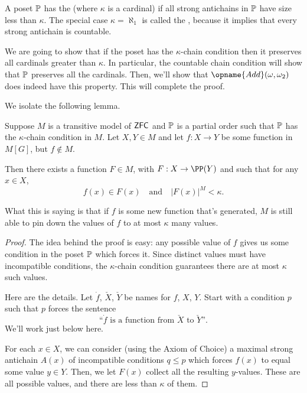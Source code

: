 \begin{definition}
	A poset $\mathbb P$ has the 
	(where $\kappa$ is a cardinal) if all strong antichains
	in $\mathbb P$ have size less than $\kappa$.
	The special case $\kappa = \aleph_1$ is called the ,
	because it implies that every strong antichain is countable.
\end{definition}

We are going to show that if the poset has the $\kappa$-chain condition
then it preserves all cardinals greater than $\kappa$.
In particular, the countable chain condition will show that $\mathbb P$ preserves all the cardinals.
Then, we'll show that $\opname{Add}(\omega, \omega_2)$ does indeed have this property.
This will complete the proof.

We isolate the following lemma.
\begin{lemma}
	Suppose $M$ is a transitive model of $\mathsf{ZFC}$ and $\mathbb P$ is a partial order
	such that $\mathbb P$ has the $\kappa$-chain condition in $M$.
	Let $X,Y \in M$ and let $f: X \to Y$
	be some function in $M[G]$, but $f \notin M$.

	Then there exists a function $F \in M$, with $F: X \to \PP(Y)$ and such that
	for any $x \in X$,
	\[ f(x) \in F(x) \quad\text{and}\quad \left\lvert F(x) \right\rvert^M < \kappa. \]
\end{lemma}
What this is saying is that if $f$ is some new function that's generated,
$M$ is still able to pin down the values of $f$ to at most $\kappa$ many values.

\begin{proof}
	The idea behind the proof is easy: any possible value of $f$ gives us some condition in
	the poset $\mathbb P$ which forces it.
	Since distinct values must have incompatible conditions,
	the $\kappa$-chain condition guarantees
	there are at most $\kappa$ such values.

	Here are the details.
	Let $\dot f$, $\check X$, $\check Y$ be names for $f$, $X$, $Y$.
	Start with a condition $p$ such that $p$ forces the sentence
	\[ \text{``$\dot f$ is a function from $\check X$ to $\check Y$''}. \]
	We'll work just below here.

	For each $x \in X$, we can consider (using the Axiom of Choice) a maximal strong antichain $A(x)$
	of incompatible conditions $q \le p$ which forces $f(x)$ to equal some value $y \in Y$.
	Then, we let $F(x)$ collect all the resulting $y$-values.
	These are all possible values, and there are less than $\kappa$ of them.
\end{proof}

